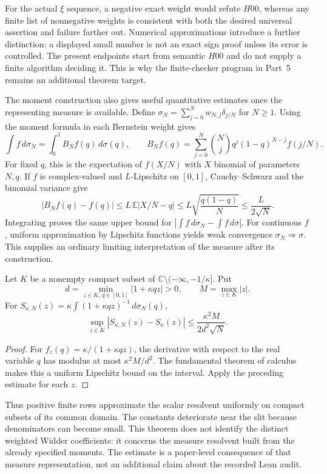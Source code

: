 For the actual $\xi$ sequence, a negative exact weight would refute
$H00$, whereas any finite list of nonnegative weights is consistent
with both the desired universal assertion and failure farther out.
Numerical approximations introduce a further distinction: a displayed
small number is not an exact sign proof unless its error is controlled.
The present endpoints start from semantic $H00$ and do not supply a
finite algorithm deciding it. This is why the finite-checker program
in Part~5 remains an additional theorem target.

The moment construction also gives useful quantitative estimates once
the representing measure is available. Define
$\sigma_N=\sum_{j=0}^N w_{N,j}\delta_{j/N}$ for $N\ge1$.
Using the moment formula in each Bernstein weight gives
\[
 \int f\,d\sigma_N
 =\int_0^1 B_Nf(q)\,d\sigma(q),\qquad
 B_Nf(q)=\sum_{j=0}^N\binom Nj q^j(1-q)^{N-j}f(j/N).
\]
For fixed $q$, this is the expectation of $f(X/N)$ with
$X$ binomial of parameters $N,q$. If $f$ is complex-valued and
$L$-Lipschitz on $[0,1]$, Cauchy--Schwarz and the binomial variance give
\[
 |B_Nf(q)-f(q)|
 \le L\,\mathbb E|X/N-q|
 \le L\sqrt{\frac{q(1-q)}N}\le\frac{L}{2\sqrt N}.
\]
Integrating proves the same upper bound for
$|\int f\,d\sigma_N-\int f\,d\sigma|$. For continuous $f$,
uniform approximation by Lipschitz functions yields weak convergence
$\sigma_N\Rightarrow\sigma$. This supplies an ordinary limiting
interpretation of the measure after its construction.

\begin{proposition}\label{app:resolvent-rate}
Let $K$ be a nonempty compact subset of
$\mathbb C\setminus(-\infty,-1/\kappa]$. Put
\[
 d=\min_{z\in K,\,q\in[0,1]}|1+\kappa qz|>0,
 \qquad M=\max_{z\in K}|z|.
\]
For $S_{\kappa,N}(z)=\kappa\int(1+\kappa qz)^{-1}\,d\sigma_N(q)$,
\[
 \sup_{z\in K}|S_{\kappa,N}(z)-S_\kappa(z)|
 \le\frac{\kappa^2M}{2d^2\sqrt N}.
\]
\end{proposition}
\begin{proof}
For $f_z(q)=\kappa/(1+\kappa qz)$, the derivative with respect to
the real variable $q$ has modulus at most $\kappa^2M/d^2$.
The fundamental theorem of calculus makes this a uniform Lipschitz
bound on the interval. Apply the preceding estimate for each $z$.
\end{proof}
Thus positive finite rows approximate the scalar resolvent uniformly
on compact subsets of its common domain. The constants deteriorate
near the slit because denominators can become small. This theorem
does not identify the distinct weighted Widder coefficients: it
concerns the measure resolvent built from the already specified
moments. The estimate is a paper-level consequence of that measure
representation, not an additional claim about the recorded Lean audit.

